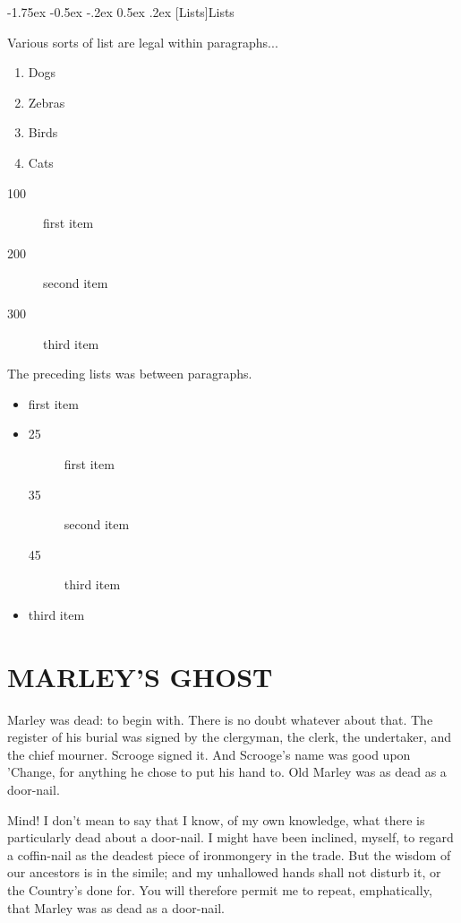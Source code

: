 \documentclass[11pt,twoside]{article}\makeatletter
\makeatletter
\renewcommand\section{\@startsection {section}{1}{\z@}%
     {-1.75ex \@plus -0.5ex \@minus -.2ex}%
     {0.5ex \@plus .2ex}%
     {\reset@font\Large\bfseries\sffamily}}
\renewcommand\subsection{\@startsection{subsection}{2}{\z@}%
     {-1.75ex\@plus -0.5ex \@minus- .2ex}%
     {0.5ex \@plus .2ex}%
     {\reset@font\Large\sffamily}}
\def\DivI{\section}
\def\DivII{\subsection}
\def\DivI{\chapter}
\def\DivII{\section}
\makeatother
\begin{document}
\DivII[Lists]{Lists}\label{P1}\par
Various sorts of list are legal within paragraphs...           \begin{enumerate}

\item Dogs
\item Zebras
\item Birds
\item Cats
\end{enumerate}         \begin{description}

\item[100]first item           
\item[200]second item           
\item[300]third item           
\end{description} \par
The preceding lists was between paragraphs.\par
            \begin{itemize}

\item first item             
\item                \begin{description}

\item[25]first item                 
\item[35]second item                 
\item[45]third item                 
\end{description}              
\item third item             
\end{itemize}          
\DivI[MARLEY'S GHOST]{MARLEY'S GHOST}\label{S1}\par
Marley was dead: to begin with.  There is no doubt whatever about that.  The register of his burial was signed by the clergyman, the clerk, the undertaker, and the chief mourner.  Scrooge signed it.  And Scrooge's name was good upon 'Change, for anything he chose to put his hand to.  Old Marley was as dead as a door-nail.  \par
Mind!  I don't mean to say that I know, of my own knowledge, what there is particularly dead about a door-nail. I might have been inclined, myself, to regard a coffin-nail as the deadest piece of ironmongery in the trade.  But the wisdom of our ancestors is in the simile; and my unhallowed  hands shall not disturb it, or the Country's done for.  You will therefore permit me to repeat, emphatically, that Marley was as dead as a door-nail.  \par
\end{document}
